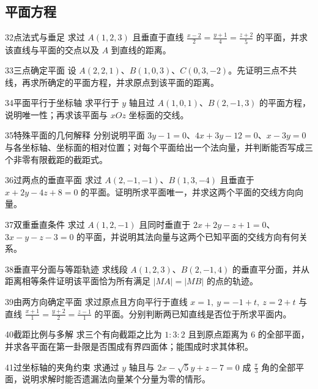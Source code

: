 \subsection{平面方程}
\begin{exercise}{32}{点法式与垂足}
求过 $A(1,2,3)$ 且垂直于直线 $\frac{x-2}{2}=\frac{y+1}{4}=\frac{z+2}{5}$ 的平面，并求该直线与平面的交点以及 $A$ 到直线的距离。
\end{exercise}
\begin{exercise}{33}{三点确定平面}
设 $A(2,2,1)$、$B(1,0,3)$、$C(0,3,-2)$。先证明三点不共线，再求所确定的平面方程，并求原点到该平面的距离。
\end{exercise}
\begin{exercise}{34}{平面平行于坐标轴}
求平行于 $y$ 轴且过 $A(1,0,1)$、$B(2,-1,3)$ 的平面方程，说明唯一性；再求该平面与 $xOz$ 坐标面的交线。
\end{exercise}
\begin{exercise}{35}{特殊平面的几何解释}
分别说明平面 $3y-1=0$、$4x+3y-12=0$、$x-3y=0$ 与各坐标轴、坐标面的相对位置；对每个平面给出一个法向量，并判断能否写成三个非零有限截距的截距式。
\end{exercise}
\begin{exercise}{36}{过两点的垂直平面}
求过 $A(2,-1,-1)$、$B(1,3,-4)$ 且垂直于 $x+2y-4z+8=0$ 的平面。证明所求平面唯一，并求这两个平面的交线方向向量。
\end{exercise}
\begin{exercise}{37}{双重垂直条件}
求过 $A(1,2,-1)$ 且同时垂直于 $2x+2y-z+1=0$、$3x-y-z-3=0$ 的平面，并说明其法向量与这两个已知平面的交线方向有何关系。
\end{exercise}
\begin{exercise}{38}{垂直平分面与等距轨迹}
求线段 $A(1,2,3)$、$B(2,-1,4)$ 的垂直平分面，并从距离相等条件证明该平面恰为所有满足 $|MA|=|MB|$ 的点的轨迹。
\end{exercise}
\begin{exercise}{39}{由两方向确定平面}
求过原点且方向平行于直线 $x=1,\ y=-1+t,\ z=2+t$ 与直线 $\frac{x+1}{1}=\frac{y+2}{2}=\frac{z-1}{1}$ 的平面。分别判断两已知直线是否位于所求平面内。
\end{exercise}
\begin{exercise}{40}{截距比例与多解}
求三个有向截距之比为 $1:3:2$ 且到原点距离为 $6$ 的全部平面，并求各平面在第一卦限是否围成有界四面体；能围成时求其体积。
\end{exercise}
\begin{exercise}{41}{过坐标轴的夹角约束}
求通过 $y$ 轴且与 $2x-\sqrt5y+z-7=0$ 成 $\frac\pi3$ 角的全部平面，说明求解时能否遗漏法向量某个分量为零的情形。
\end{exercise}
